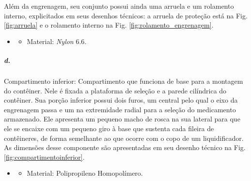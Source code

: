     
    Além da engrenagem, seu conjunto possui ainda uma arruela e um rolamento interno, explicitados em seus desenhos técnicos: a arruela de proteção está na Fig. \ref{fig:arruela} e o rolamento interno na Fig. \ref{fig:rolamento_engrenagem}.
    
    \begin{itemize}
   \item[]
  \begin{itemize}
        \item Material: \textit{Nylon} 6.6.
   \end{itemize}
   \end{itemize}
   
    
    \subparagraph*{d.} \label{retorno_compartimentoinferior}
    Compartimento inferior: Compartimento que funciona de base para a montagem do contêiner. Nele é fixada a plataforma de seleção e a parede cilíndrica do contêiner. Sua porção inferior possui dois furos, um central pelo qual o eixo da engrenagem passa e um na extremidade radial para a seleção do medicamento armazenado. Ele apresenta um pequeno macho de rosca na sua lateral para que ele se encaixe com um pequeno giro à base que sustenta cada fileira de contêineres, de forma semelhante ao que ocorre com o copo de um liquidificador. As dimensões desse componente são apresentadas em seu desenho técnico na Fig. \ref{fig:compartimentoinferior}.
    
    \begin{itemize}
   \item[]
   \begin{itemize}
       \item Material: Polipropileno Homopolímero.
   \end{itemize}
   \end{itemize}
     

